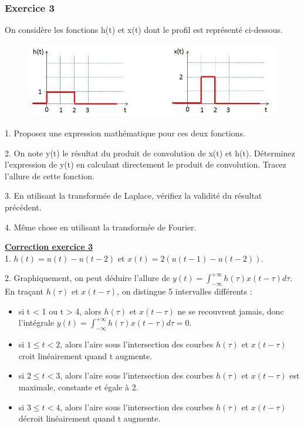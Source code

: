 \documentclass[11pt]{report}
\begin{document}
	
	\vspace{1\baselineskip}
		
	\subsubsection{Exercice 3}
	
	On considère les fonctions h(t) et x(t) dont le profil est représenté ci-dessous.
	\begin{figure}[h!]
		\centering
		\includegraphics[scale=0.5]{images/Courbes_TD_Convolution_2.jpg} 
	\end{figure}
	
	1. Proposez une expression mathématique pour ces deux fonctions.
	
	2. On note y(t) le résultat du produit de convolution de x(t) et h(t). Déterminez l'expression de y(t) en calculant directement le produit de convolution. Tracez l'allure de cette fonction.
	
	3. En utilisant la transformée de Laplace, vérifiez la validité du résultat précédent.
	
	4. Même chose en utilisant la transformée de Fourier.
	
	\vspace{1\baselineskip}
	
	\textbf{\underline{Correction exercice 3}}\\
	
	1. $h(t)=u(t)-u(t-2)$ et $x(t)=2(u(t-1)-u(t-2))$.
	
	2. Graphiquement, on peut déduire l'allure de $y(t)=\int_{-\infty}^{+\infty}h(\tau)x(t-\tau)d\tau$. En traçant $h(\tau)$ et $x(t-\tau)$, on distingue 5 intervalles différents :
	\begin{itemize}
		\item si t < 1 ou t > 4, alors $h(\tau)$ et $x(t-\tau)$ ne se recouvrent jamais, donc l'intégrale $y(t)=\int_{-\infty}^{+\infty}h(\tau)x(t-\tau)d\tau = 0$.
		\item si $1 \leq t<2$, alors l'aire sous l'intersection des courbes $h(\tau)$ et $x(t-\tau)$ croit linéairement quand t augmente.
		\item si $2 \leq t < 3$, alors l'aire sous l'intersection des courbes $h(\tau)$ et $x(t-\tau)$ est maximale, constante et égale à 2.
		\item si $3 \leq t < 4$,  alors l'aire sous l'intersection des courbes $h(\tau)$ et $x(t-\tau)$ décroit linéairement quand t augmente.
	\end{itemize}
	
\end{document}
